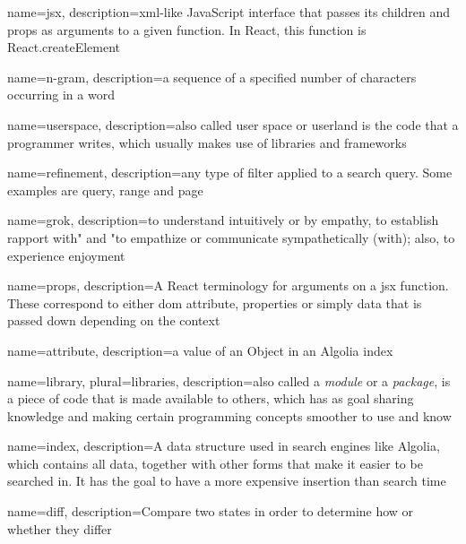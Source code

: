 
{
  name=jsx,
  description={\acrshort{xml}-like JavaScript interface that passes its children and props as arguments to a given function. In React, this function is React.createElement}
}
 
{
  name={n-gram},
  description={a sequence of a specified number of characters occurring in a word\cite{kimbrell1988searching}~}
}
 
{
  name=userspace,
  description={also called user space or userland is the code that a programmer writes, which usually makes use of libraries and frameworks}
}

{
  name=refinement,
  description={any type of filter applied to a search query. Some examples are query, range and page}
}

{
  name=grok,
  description={to understand intuitively or by empathy, to establish rapport with" and "to empathize or communicate sympathetically (with); also, to experience enjoyment\cite{grok}~}
}

{
  name=props,
  description={A React terminology for arguments on a \gls{jsx} function. These correspond to either \acrshort{dom} attribute, properties or simply data that is passed down depending on the context}
}

{
  name=attribute,
  description={a value of an Object in an Algolia index}
}

{
  name=library,
  plural=libraries,
  description={also called a \emph{module} or a \emph{package}, is a piece of code that is made available to others, which has as goal sharing knowledge and making certain programming concepts smoother to use and know}
}

{
  name=index,
  description={A data structure used in search engines like Algolia, which contains all data, together with other forms that make it easier to be searched in. It has the goal to have a more expensive insertion than search time}
}

{
  name=diff,
  description={Compare two states in order to determine how or whether they differ\cite{diff}}
}

